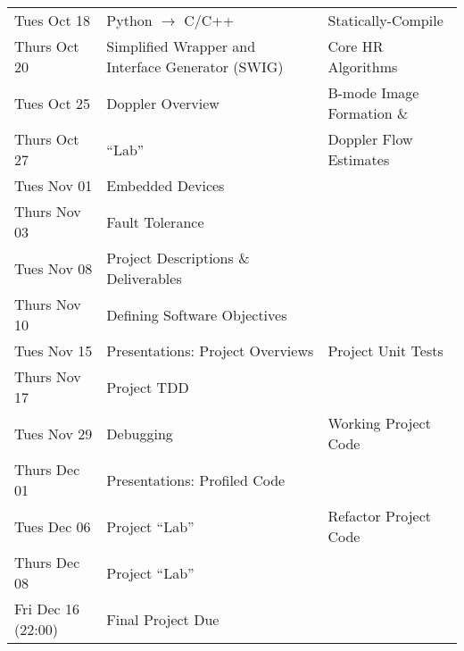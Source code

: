 \begin{longtable}[c]{|l|l|l|}
    \hline
    Tues Oct 18     & Python $\rightarrow$ C/C++ & Statically-Compile \\
    Thurs Oct 20    & Simplified Wrapper and Interface Generator (SWIG) & Core HR Algorithms \\
    \hline
    Tues Oct 25     & Doppler Overview & B-mode Image Formation \& \\
    Thurs Oct 27    & ``Lab'' & Doppler Flow Estimates \\
    \hline
    Tues Nov 01     & Embedded Devices & \\
    Thurs Nov 03    & Fault Tolerance & \\
    \hline
    Tues Nov 08     & Project Descriptions \& Deliverables & \\
    Thurs Nov 10    & Defining Software Objectives & \\
    \hline
    Tues Nov 15     & Presentations: Project Overviews  & Project Unit Tests \\
    Thurs Nov 17    & Project TDD & \\
    \hline
    Tues Nov 29     & Debugging & Working Project Code \\
    Thurs Dec 01    & Presentations: Profiled Code & \\
    \hline
    Tues Dec 06     & Project ``Lab'' & Refactor Project Code \\
    Thurs Dec 08    & Project ``Lab'' & \\
    \hline
    Fri Dec 16 (22:00) & Final Project Due  & \\
    \hline

\end{longtable}
